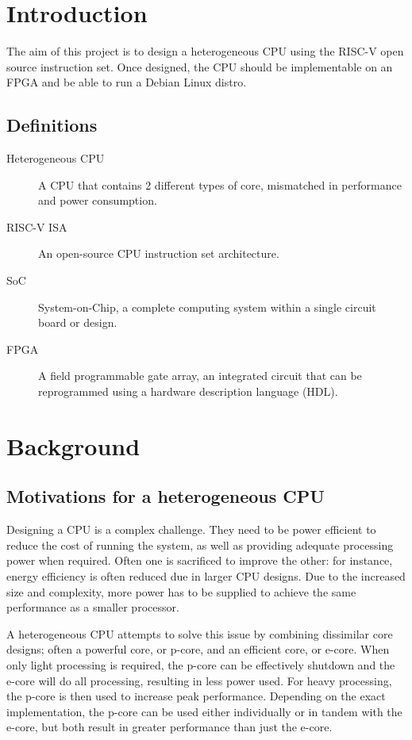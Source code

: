 \documentclass[a4paper,fleqn,11pt]{article}
\begin{document}


\pagestyle{plain}

\section{Introduction}
The aim of this project is to design a heterogeneous CPU using the RISC-V open source instruction set. Once designed, the CPU should be implementable on an FPGA and be able to run a Debian Linux distro. 

\subsection{Definitions}
\begin{description}
    \item[Heterogeneous CPU] A CPU that contains 2 different types of core, mismatched in performance and power consumption.
    \item[RISC-V ISA] An open-source CPU instruction set architecture.
    \item[SoC] System-on-Chip, a complete computing system within a single circuit board or design. 
    \item[FPGA] A field programmable gate array, an integrated circuit that can be reprogrammed using a hardware description language (HDL).
\end{description}

\section{Background}
\subsection{Motivations for a heterogeneous CPU}
Designing a CPU is a complex challenge. They need to be power efficient to reduce the cost of running the system, as well as providing adequate processing power when required. Often one is sacrificed to improve the other: for instance, energy efficiency is often reduced due in larger CPU designs. Due to the increased size and complexity, more power has to be supplied to achieve the same performance as a smaller processor.

A heterogeneous CPU attempts to solve this issue by combining dissimilar core designs; often a powerful core, or p-core, and an efficient core, or e-core. When only light processing is required, the p-core can be effectively shutdown and the e-core will do all processing, resulting in less power used. For heavy processing, the p-core is then used to increase peak performance. Depending on the exact implementation, the p-core can be used either individually or in tandem with the e-core, but both result in greater performance than just the e-core.
\end{document}
